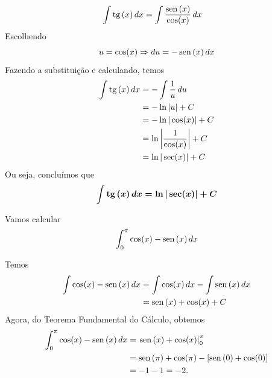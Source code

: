 \cleardoublepage\documentclass[../main.tex]{subfiles}
\begin{document}
\begin{align*}
  \int \operatorname{tg}\,(x)\,dx &= \int \frac{\operatorname{sen}\,(x)}{\cos(x)}\,dx
\end{align*}
Escolhendo
\begin{equation*}
  u = \cos(x) \Rightarrow du = -\operatorname{sen}\,(x)\,dx
\end{equation*}
Fazendo a substituição e calculando, temos
\begin{align*}
  \int \operatorname{tg}\,(x)\,dx &= -\int \frac{1}{u}\,du \\
                  &= -\ln|u| + C \\
                  &= -\ln|\cos(x)| + C \\
                  &= \ln\left|\frac{1}{\cos(x)}\right| + C\\
                  &= \ln|\sec(x)| + C
\end{align*}
Ou seja, concluímos que
\begin{equation}
  \boldsymbol{\int\operatorname{tg}\,(x)\,dx = \ln|\sec(x)| + C}
\end{equation}

\begin{ex}
  Vamos calcular
  \begin{equation*}
    \int_0^{\pi} \cos(x) - \operatorname{sen}\,(x)\,dx
  \end{equation*}
  \begin{sol}
  Temos
  \begin{align*}
    \int \cos(x)-\operatorname{sen}\,(x)\,dx &= \int\cos(x)\,dx - \int\operatorname{sen}\,(x)\,dx\\
                             &= \operatorname{sen}\,(x) + \cos(x) + C
  \end{align*}
  Agora, do Teorema Fundamental do Cálculo, obtemos
  \begin{align*}
    \int_0^{\pi} \cos(x)-\operatorname{sen}\,(x)\,dx &= \left.\operatorname{sen}\,(x) + \cos(x)\right|_0^\pi \\
                             &= \operatorname{sen}\,(\pi)+\cos(\pi) - \left[\operatorname{sen}\,(0)+\cos(0)\right]\\
                             &= -1 - 1 = -2.
  \end{align*}
  \end{sol}
\end{ex}
\end{document}
